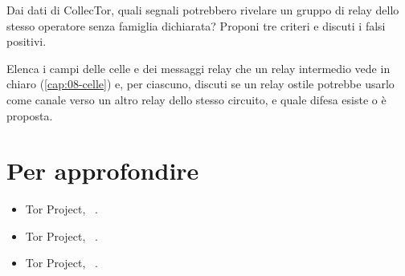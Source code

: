 \begin{esercizio}[2]\label{es:27-segnali}
Dai dati di CollecTor, quali segnali potrebbero rivelare un gruppo di relay dello stesso operatore senza famiglia dichiarata? Proponi tre criteri e discuti i falsi positivi.
\end{esercizio}

\begin{esercizio}[3]\label{es:27-canali}
Elenca i campi delle celle e dei messaggi relay che un relay intermedio vede in chiaro (\cref{cap:08-celle}) e, per ciascuno, discuti se un relay ostile potrebbe usarlo come canale verso un altro relay dello stesso circuito, e quale difesa esiste o è proposta.
\end{esercizio}

\section*{Per approfondire}
\begin{itemize}
  \item Tor Project, ~\cite{torblog2014relayearly}.
  \item Tor Project, ~\cite{torblog2022badrelays}.
  \item Tor Project, ~\cite{torblog2023pow}.
\end{itemize}
